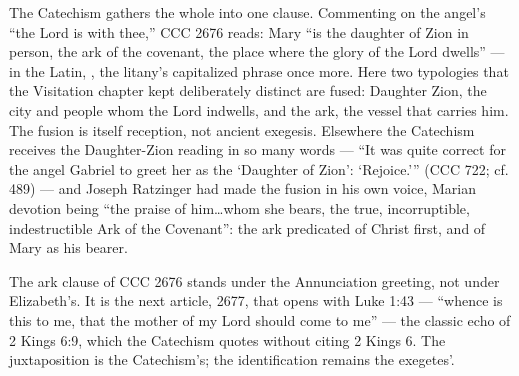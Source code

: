 The Catechism gathers the whole into one clause. Commenting on the angel's
``the Lord is with thee,'' CCC 2676 reads: Mary ``is the daughter of Zion in
person, the ark of the covenant, the place where the glory of the Lord
dwells'' --- in the Latin, , the litany's capitalized phrase once more.
Here two typologies that the Visitation chapter kept deliberately
distinct are fused: Daughter Zion, the city and people whom the Lord indwells, and
the ark, the vessel that carries him. The fusion is itself reception, not
ancient exegesis. Elsewhere the Catechism receives the Daughter-Zion reading
in so many words --- ``It was quite correct for the angel Gabriel to greet
her as the `Daughter of Zion': `Rejoice.'\thinspace'' (CCC 722; cf. 489) ---
and Joseph Ratzinger had made the fusion in his own voice, Marian devotion
being ``the praise of him\ldots whom she bears, the true, incorruptible,
indestructible Ark of the Covenant'': the ark predicated of Christ first,
and of Mary as his bearer.

The ark clause of CCC 2676 stands under the Annunciation greeting, not under
Elizabeth's. It is the next article, 2677, that opens with Luke 1:43 ---
``whence is this to me, that the mother of my Lord should come to me'' ---
the classic echo of 2 Kings 6:9, which the Catechism quotes without citing 2
Kings 6. The juxtaposition is the Catechism's; the identification remains
the exegetes'.

